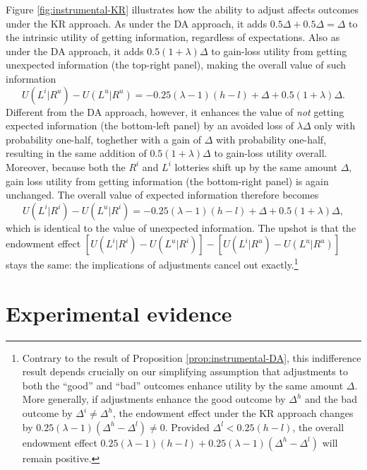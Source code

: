 \documentclass[12pt]{article}
\begin{document}
Figure \ref{fig:instrumental-KR} illustrates how the ability to adjust affects outcomes under the KR approach. As under the DA approach, it adds $0.5 \Delta + 0.5 \Delta = \Delta$ to the intrinsic utility of getting information, regardless of expectations. Also as under the DA approach, it adds $0.5 (1+\lambda) \Delta$ to gain-loss utility from getting unexpected information (the top-right panel), making the overall value of such information
\begin{equation*}
  U(L^i|R^u)-U(L^u|R^u)=-0.25(\lambda-1)(h-l)+\Delta+0.5(1+\lambda)\Delta.
\end{equation*}
Different from the DA approach, however, it enhances the value of \emph{not} getting expected information (the bottom-left panel) by an avoided loss of $\lambda \Delta$ only with probability one-half, toghether with a gain of $\Delta$ with probability one-half, resulting in the same addition of $0.5(1+\lambda)\Delta$ to gain-loss utility overall. Moreover, because both the $R^i$ and $L^i$ lotteries shift up by the same amount $\Delta$, gain loss utility from getting information (the bottom-right panel) is again unchanged. The overall value of expected information therefore becomes
\begin{equation*}
  U(L^i|R^i)-U(L^u|R^i)=-0.25(\lambda-1)(h-l)+\Delta+0.5(1+\lambda)\Delta,
\end{equation*}
which is identical to the value of unexpected information. The upshot is that the endowment effect $[U(L^i|R^i)-U(L^u|R^i)]-[U(L^i|R^u)-U(L^u|R^u)]$ stays the same: the implications of adjustments cancel out exactly.\footnote{Contrary to the result of Proposition \ref{prop:instrumental-DA}, this indifference result depends crucially on our simplifying assumption that adjustments to both the \enquote{good} and \enquote{bad} outcomes enhance utility by the same amount $\Delta$. More generally, if adjustments enhance the good outcome by $\Delta^h$ and the bad outcome by $\Delta^i \neq \Delta^h$, the endowment effect under the KR approach changes by $0.25(\lambda-1)(\Delta^h-\Delta^l) \neq 0$. Provided $\Delta^l<0.25(h-l)$, the overall endowment effect $0.25(\lambda-1)(h-l)+0.25(\lambda-1)(\Delta^h-\Delta^l)$ will remain positive.}

\FloatBarrier


\section{Experimental evidence}
\end{document}

